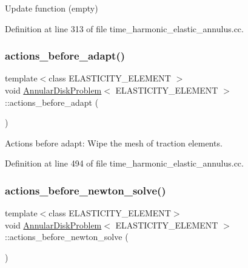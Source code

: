 Update function (empty) 



Definition at line 313 of file time\+\_\+harmonic\+\_\+elastic\+\_\+annulus.\+cc.

\mbox{\label{classAnnularDiskProblem_a83c987045b1bdc704ed336072b8ceb16}} 
\subsubsection{\texorpdfstring{actions\+\_\+before\+\_\+adapt()}{actions\_before\_adapt()}}
{\footnotesize\ttfamily template$<$class E\+L\+A\+S\+T\+I\+C\+I\+T\+Y\+\_\+\+E\+L\+E\+M\+E\+NT $>$ \\
void \hyperlink{classAnnularDiskProblem}{Annular\+Disk\+Problem}$<$ E\+L\+A\+S\+T\+I\+C\+I\+T\+Y\+\_\+\+E\+L\+E\+M\+E\+NT $>$\+::actions\+\_\+before\+\_\+adapt (\begin{DoxyParamCaption}{ }\end{DoxyParamCaption})}



Actions before adapt\+: Wipe the mesh of traction elements. 



Definition at line 494 of file time\+\_\+harmonic\+\_\+elastic\+\_\+annulus.\+cc.

\mbox{\label{classAnnularDiskProblem_a147e5fbe37f7132bbace2b713acb03a5}} 
\subsubsection{\texorpdfstring{actions\+\_\+before\+\_\+newton\+\_\+solve()}{actions\_before\_newton\_solve()}}
{\footnotesize\ttfamily template$<$class E\+L\+A\+S\+T\+I\+C\+I\+T\+Y\+\_\+\+E\+L\+E\+M\+E\+NT$>$ \\
void \hyperlink{classAnnularDiskProblem}{Annular\+Disk\+Problem}$<$ E\+L\+A\+S\+T\+I\+C\+I\+T\+Y\+\_\+\+E\+L\+E\+M\+E\+NT $>$\+::actions\+\_\+before\+\_\+newton\+\_\+solve (\begin{DoxyParamCaption}{ }\end{DoxyParamCaption})\hspace{0.3cm}{\ttfamily [inline]}}



